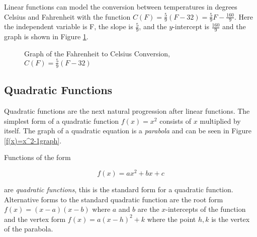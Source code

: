 \begin{example}
    Linear functions can model the conversion between temperatures in degrees Celsius and Fahrenheit with the function $C(F) = \frac{5}{9}(F - 32) = \frac{5}{9}F - \frac{160}{9}$. Here the independent variable is F, the slope is $\frac{5}{9}$, and the $y$-intercept is $\frac{160}{9}$ and the graph is shown in Figure \ref{FtoCgraph}.

    \begin{figure}[!ht]
        \centering
        \label{FtoCgraph}
        \caption{Graph of the Fahrenheit to Celsius Conversion, $C(F) = \frac{5}{9}(F-32)$}
    \end{figure}
\end{example}


\subsection{Quadratic Functions}
Quadratic functions are the next natural progression after linear functions. The simplest form of a quadratic function $f(x) = x^2$ consists of $x$ multiplied by itself. The graph of a quadratic equation is a \textit{parabola} and can be seen in Figure \ref{f(x)=x^2-1graph}.

\begin{definition}
    Functions of the form

    \begin{equation}
        f(x) = ax^2 + bx + c
    \end{equation}

    \noindent are \textit{quadratic functions}, this is the standard form for a quadratic function. Alternative forms to the standard quadratic function are the root form $f(x) = (x-a)(x-b)$ where $a$ and $b$ are the $x$-intercepts of the function and the vertex form $f(x) = a(x-h)^2+k$ where the point $h,k$ is the vertex of the parabola.
\end{definition}

